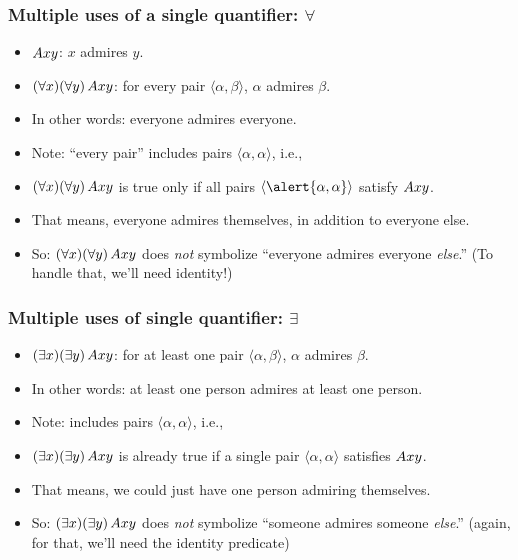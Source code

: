 \begin{frame}
  \frametitle{Multiple uses of a single quantifier: $\forall$}

\begin{itemize}[<+->]
  \item $Axy$: $x$ admires $y$.
  \item $(\forall x)(\forall y)\, Axy$: for every pair $\langle
  \alpha,\beta\rangle$, $\alpha$ admires $\beta$.
  \item In other words: everyone admires everyone.
  \item Note: ``every pair'' includes pairs $\langle\alpha, \alpha\rangle$, i.e.,
  \item $(\forall x)(\forall y)\, Axy$ is true only if all pairs $\langle \alert{\alpha, \alpha}\rangle$ satisfy $Axy$.
  \item That means, everyone admires themselves, in addition to everyone else.
  \item So: $(\forall x)(\forall y)\, Axy$ does \emph{not} symbolize ``everyone admires everyone \emph{else}.'' (To handle that, we'll need identity!)
\end{itemize}

\end{frame}

\begin{frame}
  \frametitle{Multiple uses of single quantifier: $\exists$}

\begin{itemize}[<+->]
  \item $(\exists x)(\exists y)\, Axy$: for at least one pair $\langle \alpha,\beta\rangle$, $\alpha$ admires $\beta$.
  \item In other words: at least one person admires at least one person.
  \item Note: includes pairs $\langle\alpha, \alpha\rangle$, i.e.,
  \item $(\exists x)(\exists y)\, Axy$ is already true if a single pair $\langle \alpha, \alpha\rangle$ satisfies $ Axy$.
  \item That means, we could just have one person admiring themselves.
  \item So: $(\exists x)(\exists y)\, Axy$ does \emph{not} symbolize ``someone admires someone \emph{else}.'' (again, for that, we'll need the identity predicate)
\end{itemize}
\end{frame}

